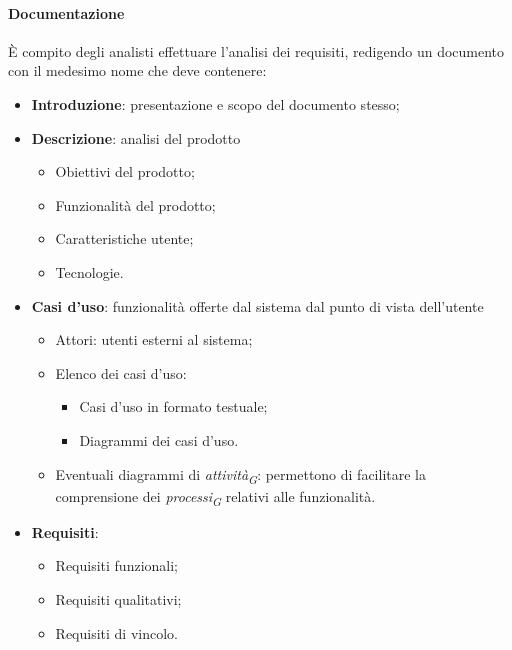 \paragraph{Documentazione}
È compito degli analisti effettuare l'analisi dei requisiti, redigendo un documento con il medesimo nome che deve contenere:
\begin{itemize}
    \item \textbf{Introduzione}: presentazione e scopo del documento stesso;
    \item \textbf{Descrizione}: analisi del prodotto
          \begin{itemize}
              \item Obiettivi del prodotto;
              \item Funzionalità del prodotto;
              \item Caratteristiche utente;
              \item Tecnologie.
          \end{itemize}
    \item \textbf{Casi d'uso}: funzionalità offerte dal sistema dal punto di vista dell'utente
        \begin{itemize}
            \item Attori: utenti esterni al sistema;
            \item Elenco dei casi d'uso:
            \begin{itemize}
                \item Casi d'uso in formato testuale;
                \item Diagrammi dei casi d'uso.
            \end{itemize}  
            \item Eventuali diagrammi di \textit{attività}\textsubscript{\textit{G}}: permettono di facilitare la comprensione dei \textit{processi}\textsubscript{\textit{G}} relativi alle funzionalità.
        \end{itemize}
    \item \textbf{Requisiti}:
        \begin{itemize}
            \item Requisiti funzionali;
            \item Requisiti qualitativi;
            \item Requisiti di vincolo.
        \end{itemize}
\end{itemize}
